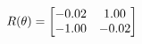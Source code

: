 \documentclass[preview]{standalone}
\begin{document}
\begin{align*}
\special{dvisvgm:raw <g id='unique000'>}R(\theta) = \begin{bmatrix}-0.02 & 1.00\\-1.00 & -0.02\end{bmatrix}\special{dvisvgm:raw </g>}
\end{align*}
\end{document}
